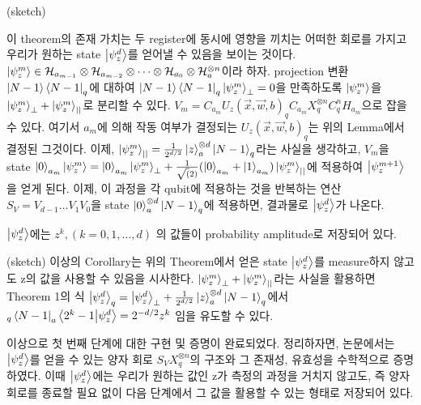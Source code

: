 \begin{pf}(sketch)

    이 theorem의 존재 가치는 두 register에 동시에 영향을 끼치는 어떠한 회로를 가지고 우리가 원하는 state \(\ket{\psi_z^d}\)를 얻어낼 수 있음을 보이는 것이다.
    \(\ket{\psi_z^m} \in \mathcal{H}_{a_{m-1}} \otimes \mathcal{H}_{a_{m-2}} \otimes \dots \otimes \mathcal{H}_{a_{0}} \otimes \mathcal{H}_{a}^{\otimes n}\)이라 하자.
    projection 변환 \(\ket{N-1}\bra{N-1}_q\)에 대하여 \(\ket{N-1}\bra{N-1}_q\ket{\psi_z^m}_\perp = 0\)을 만족하도록 \(\ket{\psi_z^m}\)을 \(\ket{\psi_z^m}_\perp + \ket{\psi_z^m}_{||}\)로 분리할 수 있다.
    \(V_m = C_{a_m}U_z(\vec{x},\vec{w},b)_qC_{a_m}X_q^{\otimes n}C_q^nH_{a_m}\)으로 잡을 수 있다. 여기서 \(a_m\)에 의해 작동 여부가 결정되는 \(U_z(\vec{x},\vec{w},b)_q\)는 위의 Lemma에서 결정된 그것이다.
    이제, \(\ket{\psi_z^m}_{||} = \frac{1}{2^{d/2}}\ket{z}_a^{\otimes d}\ket{N-1}_q\)라는 사실을 생각하고, \(V_m\)을 state \(\ket{0}_{a_m}\ket{\psi_z^m} = \ket{0}_{a_m}\ket{\psi_z^m}_\perp + \frac{1}{\sqrt(2)}(\ket{0}_{a_m}+\ket{1}_{a_m})\ket{\psi_z^m}_{||}\)에 적용하여
    \(\ket{\psi_z^{m+1}}\)을 얻게 된다. 이제, 이 과정을 각 qubit에 적용하는 것을 반복하는 연산 \(S_V = V_{d-1}\dots V_1V_0\)을 state \(\ket{0}_a^{\otimes d} \ket{N-1}_q\)에 적용하면, 결과물로 \(\ket{\psi_z^d}\)가 나온다.

\end{pf}


\begin{corollary}
    \(\ket{\psi_z^d}\)에는 \(z^k, (k = 0,1,\dots,d)\) 의 값들이 probability amplitude로 저장되어 있다.
\end{corollary}

\begin{pf}(sketch)
    이상의 Corollary는 위의 Theorem에서 얻은 state \(\ket{\psi_z^d}\)를 measure하지 않고도 z의 값을 사용할 수 있음을 시사한다.
    \(\ket{\psi_z^m}_\perp + \ket{\psi_z^m}_{||}\)라는 사실을 활용하면
    Theorem 1의 식 \(\ket{\psi_z^d}_q = \ket{\psi_z^d}_\perp + \frac{1}{2^{d/2}}\ket{z}_a^{\otimes d}\ket{N-1}_q\)에서 \(_q\bra{N-1}_a\bra{2^k-1}\ket{\psi_z^d} = 2^{-d/2}z^k\) 임을 유도할 수 있다.
\end{pf}

이상으로 첫 번째 단계에 대한 구현 및 증명이 완료되었다. 정리하자면, 논문에서는 \(\ket{\psi_z^d}\)를 얻을 수 있는 양자 회로 \(S_VX_q^{\otimes n}\)의 구조와 그 존재성, 유효성을 수학적으로 증명하였다.
이때 \(\ket{\psi_z^d}\)에는 우리가 원하는 값인 z가 측정의 과정을 거치지 않고도, 즉 양자 회로를 종료할 필요 없이 다음 단계에서 그 값을 활용할 수 있는 형태로 저장되어 있다.


